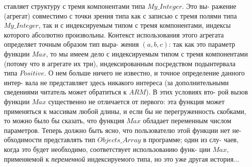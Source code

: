 ставляет структуру с тремя компонентами типа $My\_Integer$. Это вы-\linebreak
ражение  (агрегат) совместимо с точки зрения типа как с записью с\linebreak
тремя полями типа $My\_Integer$, так и с индексируемым типом с тремя\linebreak
компонентами,  индексы  которого абсолютно произвольны.  Контекст\linebreak
\newpage
\noindent
использования  этого  агрегата  определяет  точным  образом  тип  выра-\linebreak
жения $(a,b,c)$: так как это параметр функции $Max$, то мы имеем  дело с\linebreak
индексируемым  типом  с  тремя  компонентами  (потому  что  в  агрегате\linebreak
их три),  индексированным посредством подынтервала типа $Positive$. О\linebreak 
нем  больше  ничего  не  известно,  и  точное  определение  данного  интер-\linebreak
вала  не  представляет  здесь  никакого  интереса  (за  дополнительными\linebreak
сведениями читатель может обратиться к $ARM$). В этих условиях вто-\linebreak
рой  вызов  функции $Max$ существенно  не  отличается  от  первого:  эта\linebreak
функция  может  применяться  к  массивам  любой  длины,  и  если  бы  не\linebreak
перегруженность  скобками,  то  можно  было  бы  сказать,  что  функция\linebreak
$Max$ обладает переменным  числом  параметров.\newline
\hspace*{15pt}Теперь  должно быть ясно,  что  пользователю этой  функции  нет  не-\linebreak
обходимости представлять тип $Objects\_Array$ в программе; один из слу-\linebreak
чаев, когда это будет необходимо, соответствует использованию функ-\linebreak
ции $Max$, применяемой к \textit{переменной} индексируемого  типа,  но это уже\linebreak
другая  история...

